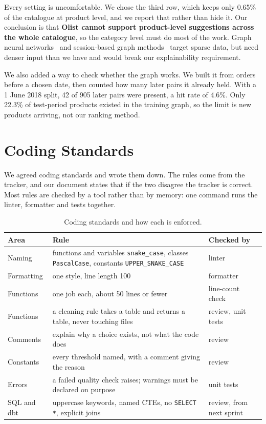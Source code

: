 \documentclass[11pt,a4paper]{article}
\newcommand{\code}[1]{\texttt{\small #1}}
\begin{document}
Every setting is uncomfortable. We chose the third row, which keeps only 0.65\% of the catalogue
at product level, and we report that rather than hide it. Our conclusion is that \textbf{Olist
cannot support product-level suggestions across the whole catalogue}, so the category level must
do most of the work. Graph neural networks~\cite{gnn} and session-based graph
methods~\cite{session} target sparse data, but need denser input than we have and would break
our explainability requirement.

We also added a way to check whether the graph works. We built it from orders before a chosen
date, then counted how many later pairs it already held. With a 1 June 2018 split, 42 of 905
later pairs were present, a hit rate of 4.6\%. Only 22.3\% of test-period products existed in
the training graph, so the limit is new products arriving, not our ranking method.

\section{Coding Standards}
We agreed coding standards and wrote them down. The rules come from the tracker, and our
document states that if the two disagree the tracker is correct. Most rules are checked by a
tool rather than by memory: one command runs the linter, formatter and tests together.

\begin{table}[h]
\centering\footnotesize
\begin{tabular}{@{}p{2.2cm}p{9.4cm}p{3.4cm}@{}}
\toprule
\textbf{Area} & \textbf{Rule} & \textbf{Checked by} \\
\midrule
Naming & functions and variables \code{snake\_case}, classes \code{PascalCase}, constants \code{UPPER\_SNAKE\_CASE} & linter \\
Formatting & one style, line length 100 & formatter \\
Functions & one job each, about 50 lines or fewer & line-count check \\
Functions & a cleaning rule takes a table and returns a table, never touching files & review, unit tests \\
Comments & explain why a choice exists, not what the code does & review \\
Constants & every threshold named, with a comment giving the reason & review \\
Errors & a failed quality check raises; warnings must be declared on purpose & unit tests \\
SQL and dbt & uppercase keywords, named CTEs, no \code{SELECT *}, explicit joins & review, from next sprint \\
\bottomrule
\end{tabular}
\caption{Coding standards and how each is enforced.}
\end{table}
\end{document}
